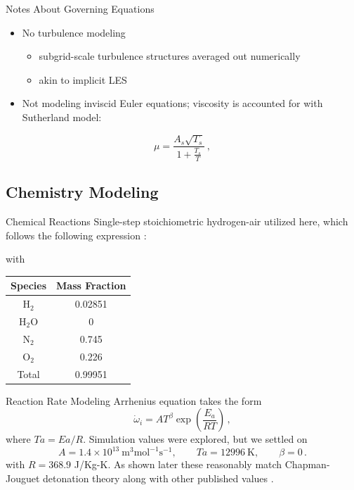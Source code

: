 \begin{frame}{Notes About Governing Equations}
\begin{itemize}
\item No turbulence modeling 
\begin{itemize}
    \item subgrid-scale turbulence structures averaged out numerically
    \item akin to implicit LES
\end{itemize}
\item Not modeling inviscid Euler equations; viscosity is accounted for with Sutherland \cite{sutherland} model:
\end{itemize}
\begin{equation}
\mu = \frac{A_s \sqrt{T_s}}{1 + \frac{T_s}{T}} \,,
\end{equation}
\end{frame}

\subsection{Chemistry Modeling}

\begin{frame}{Chemical Reactions}
Single-step stoichiometric hydrogen-air utilized here, which follows the following expression \cite{kuo}:
\begin{center}
\end{center}
with
\begin{table}[t!]
\centering
\begin{tabular}{cc}
Species & Mass Fraction \\ \hline
H\(_2\) & 0.02851 \\ 
H\(_2\)O & 0 \\
N\(_2\) & 0.745 \\ 
O\(_2\) & 0.226 \\ \hline
Total & 0.99951 \\ 
\end{tabular}
\end{table}
\end{frame}

\begin{frame}{Reaction Rate Modeling}
Arrhenius equation \cite{arrhenius} takes the form \cite{christ} 
\begin{equation}
\dot{\omega}_i = AT^\beta \exp\left(\frac{E_a}{R T}\right)\,,
\end{equation}
where $Ta = Ea/R$. Simulation values were explored, but we settled on 
\begin{equation}
   A = 1.4 \times 10^{13} ~ \text{m}^3\text{mol}^{-1}\text{s}^{-1},
   \qquad 
   Ta = 12996 ~\text{K},
   \qquad
   \beta = 0\,.
\end{equation}
with \(R = 368.9\) J/Kg-K. As shown later these reasonably match Chapman-Jouguet detonation theory \cite{chapman} along with other published values \cite{towery1,hashemi}.
\end{frame}

